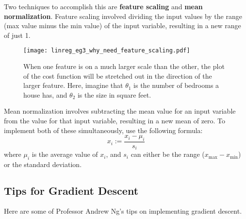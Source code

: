Two techniques to accomplish this are \textbf{feature scaling} and \textbf{mean normalization}. Feature scaling involved dividing the input values by the range (max value minus the min value) of the input variable, resulting in a new range of just 1. 

\begin{figure}[h] %
   \centering
    \graphicspath{{./Figures/}} %
   \texttt{[image: linreg\_eg3\_why\_need\_feature\_scaling.pdf]} 
   \caption[]{When one feature is on a much larger scale than the other, the plot of the cost function will be stretched out in the direction of the larger feature. Here, imagine that $\theta_1$ is the number of bedrooms a house has, and $\theta_2$ is the size in square feet. }
   \label{s}
\end{figure}

Mean normalization involves subtracting the mean value for an input variable from the value for that input variable, resulting in a new mean of zero. To implement both of these simultaneously, use the following formula:
\begin{equation}
x_i := \frac{x_i - \mu_i}{s_i}
\end{equation}
where $\mu_i$ is the average value of $x_i$, and $s_i$ can either be the range ($x_\text{max} - x_\text{min}$) or the standard deviation. 


\subsection{Tips for Gradient Descent}
Here are some of Professor Andrew Ng's tips on implementing gradient descent. 

